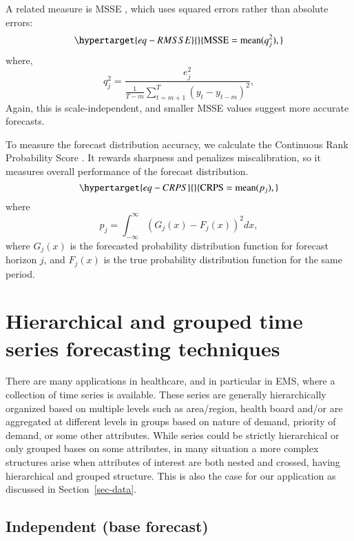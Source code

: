 \documentclass[
  authoryear,
  preprint,
  3p]{elsarticle}
\begin{document}
A related measure is MSSE \citep{hyndman2021forecasting}, which uses
squared errors rather than absolute errors:
\begin{equation}\protect\hypertarget{eq-RMSSE}{}{
  \text{MSSE} = \text{mean}(q_{j}^2),
}\label{eq-RMSSE}\end{equation} where, \[
  q^2_{j} = \frac{ e^2_{j}}
 {\displaystyle\frac{1}{T-m}\sum_{t=m+1}^T (y_{t}-y_{t-m})^2},
\] Again, this is scale-independent, and smaller MSSE values suggest
more accurate forecasts.

To measure the forecast distribution accuracy, we calculate the
Continuous Rank Probability Score \citep{gneiting2014probabilistic}. It
rewards sharpness and penalizes miscalibration, so it measures overall
performance of the forecast distribution.
\begin{equation}\protect\hypertarget{eq-CRPS}{}{
  \text{CRPS} = \text{mean}(p_j),
}\label{eq-CRPS}\end{equation} where \[
  p_j = \int_{-\infty}^{\infty} \left(G_j(x) - F_j(x)\right)^2dx,
\] where \(G_j(x)\) is the forecasted probability distribution function
for forecast horizon \(j\), and \(F_j(x)\) is the true probability
distribution function for the same period.

\hypertarget{sec-htc}{%
\section{Hierarchical and grouped time series forecasting
techniques}\label{sec-htc}}

There are many applications in healthcare, and in particular in EMS,
where a collection of time series is available. These series are
generally hierarchically organized based on multiple levels such as
area/region, health board and/or are aggregated at different levels in
groups based on nature of demand, priority of demand, or some other
attributes. While series could be strictly hierarchical or only grouped
bases on some attributes, in many situation a more complex structures
arise when attributes of interest are both nested and crossed, having
hierarchical and grouped structure. This is also the case for our
application as discussed in Section~\ref{sec-data}.

\hypertarget{independent-base-forecast}{%
\subsection{Independent (base
forecast)}\label{independent-base-forecast}}
\end{document}
